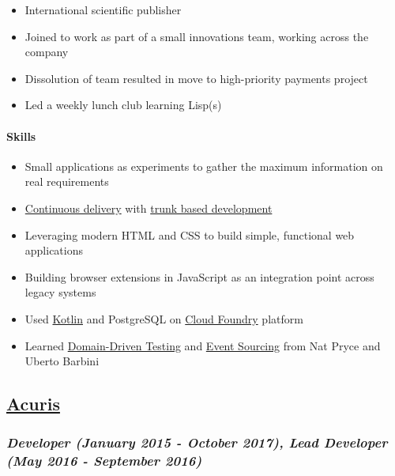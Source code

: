 \begin{itemize}
\tightlist
\item
  International scientific publisher
\item
  Joined to work as part of a small innovations team, working across the
  company
\item
  Dissolution of team resulted in move to high-priority payments project
\item
  Led a weekly lunch club learning Lisp(s)
\end{itemize}

\hypertarget{skills}{%
\paragraph{Skills}\label{skills}}

\begin{itemize}
\tightlist
\item
  Small applications as experiments to gather the maximum information on
  real requirements
\item
  \href{https://continuousdelivery.com/}{Continuous delivery} with
  \href{https://trunkbaseddevelopment.com/}{trunk based development}
\item
  Leveraging modern HTML and CSS to build simple, functional web
  applications
\item
  Building browser extensions in JavaScript as an integration point
  across legacy systems
\item
  Used \href{https://kotlinlang.org/}{Kotlin} and PostgreSQL on
  \href{https://www.cloudfoundry.org/}{Cloud Foundry} platform
\item
  Learned
  \href{http://www.natpryce.com/articles/000819.html}{Domain-Driven
  Testing} and
  \href{https://martinfowler.com/eaaDev/EventSourcing.html}{Event
  Sourcing} from Nat Pryce and Uberto Barbini
\end{itemize}

\hypertarget{acuris-1}{%
\subsection{\texorpdfstring{\href{http://www.acuris.com/}{Acuris}}{Acuris}}\label{acuris-1}}

\hypertarget{developer-january-2015---october-2017-lead-developer-may-2016---september-2016}{%
\subsubsection{\texorpdfstring{\emph{Developer (January 2015 - October
2017), Lead Developer (May 2016 - September
2016)}}{Developer (January 2015 - October 2017), Lead Developer (May 2016 - September 2016)}}\label{developer-january-2015---october-2017-lead-developer-may-2016---september-2016}}

